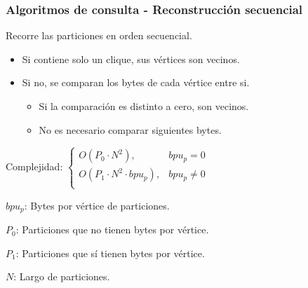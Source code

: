 \begin{frame}
\frametitle{Algoritmos de consulta - Reconstrucción secuencial}

Recorre las particiones en orden secuencial.
\begin{itemize}
	\item Si contiene solo un clique, sus vértices son vecinos.
	\item Si no, se comparan los bytes de cada vértice entre si.
		\begin{itemize}
		\footnotesize
		\item Si la comparación es distinto a cero, son vecinos.
		\item No es necesario comparar siguientes bytes.
	\end{itemize}
\end{itemize}

\vspace{6mm}
Complejidad: 
$\begin{cases}
	O(P_{0} \cdot N^{2}), & bpu_{p} = 0 \\
	O(P_{1} \cdot N^{2} \cdot bpu_{p}), & bpu_{p} \neq 0  \\
\end{cases}$

\vspace{3mm}
{\footnotesize
$bpu_{p}$: Bytes por vértice de particiones.

$P_{0}$: Particiones que no tienen bytes por vértice.

$P_{1}$: Particiones que sí tienen bytes por vértice.

$N$: Largo de particiones.
}

\end{frame}


